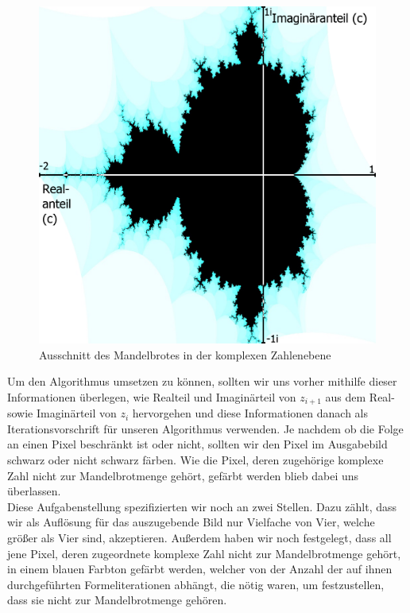 \documentclass[11pt]{scrartcl}
\begin{document}
\begin{figure}[!ht]
\centering
\includegraphics[scale=0.225]{pictures/MandelbrotMitAchsen.png}
\caption{Ausschnitt des Mandelbrotes in der komplexen Zahlenebene}
\label{fig:Mandelbrot}
\end{figure}

Um den Algorithmus umsetzen zu können, sollten wir uns vorher mithilfe dieser Informationen überlegen, wie Realteil und Imaginärteil von $z_{i+1}$ aus dem Real- sowie Imaginärteil von $z_i$ hervorgehen und diese Informationen danach als Iterationsvorschrift für unseren Algorithmus verwenden.
Je nachdem ob die Folge an einen Pixel beschränkt ist oder nicht, sollten wir den Pixel im Ausgabebild schwarz oder nicht schwarz färben.
Wie die Pixel, deren zugehörige komplexe Zahl nicht zur Mandelbrotmenge gehört, gefärbt werden blieb dabei uns überlassen. \\
Diese Aufgabenstellung spezifizierten wir noch an zwei Stellen.
Dazu zählt, dass wir als Auflösung für das auszugebende Bild nur Vielfache von Vier, welche größer als Vier sind, akzeptieren.
Außerdem haben wir noch festgelegt, dass all jene Pixel, deren zugeordnete komplexe Zahl nicht zur Mandelbrotmenge gehört, in einem blauen Farbton gefärbt werden, welcher von der Anzahl der auf ihnen durchgeführten Formeliterationen abhängt, die nötig waren, um festzustellen, dass sie nicht zur Mandelbrotmenge gehören.
\end{document}

